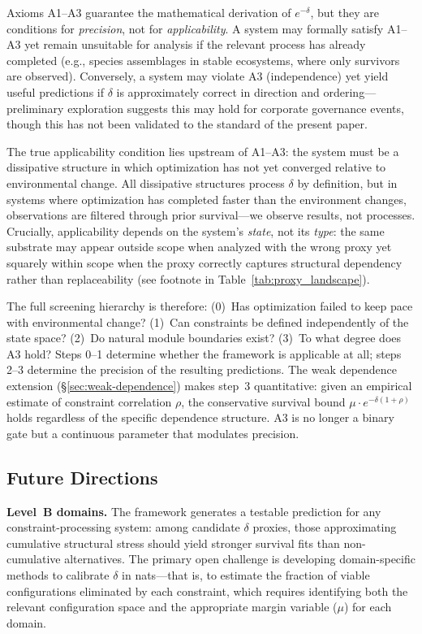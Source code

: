 \documentclass[11pt,a4paper]{article}
\begin{document}
Axioms A1--A3 guarantee the mathematical derivation of $e^{-\delta}$, but they are conditions for \emph{precision}, not for \emph{applicability}. A system may formally satisfy A1--A3 yet remain unsuitable for analysis if the relevant process has already completed (e.g., species assemblages in stable ecosystems, where only survivors are observed). Conversely, a system may violate A3 (independence) yet yield useful predictions if $\delta$ is approximately correct in direction and ordering---preliminary exploration suggests this may hold for corporate governance events, though this has not been validated to the standard of the present paper.

The true applicability condition lies upstream of A1--A3: the system must be a dissipative structure in which optimization has not yet converged relative to environmental change. All dissipative structures process $\delta$ by definition, but in systems where optimization has completed faster than the environment changes, observations are filtered through prior survival---we observe results, not processes. Crucially, applicability depends on the system's \emph{state}, not its \emph{type}: the same substrate may appear outside scope when analyzed with the wrong proxy yet squarely within scope when the proxy correctly captures structural dependency rather than replaceability (see footnote in Table~\ref{tab:proxy_landscape}).

The full screening hierarchy is therefore: (0)~Has optimization failed to keep pace with environmental change? (1)~Can constraints be defined independently of the state space? (2)~Do natural module boundaries exist? (3)~To what degree does A3 hold? Steps 0--1 determine whether the framework is applicable at all; steps 2--3 determine the precision of the resulting predictions. The weak dependence extension (\S\ref{sec:weak-dependence}) makes step~3 quantitative: given an empirical estimate of constraint correlation $\rho$, the conservative survival bound $\mu \cdot e^{-\delta(1+\rho)}$ holds regardless of the specific dependence structure. A3 is no longer a binary gate but a continuous parameter that modulates precision.

\subsection{Future Directions}

\textbf{Level~B domains.} The framework generates a testable prediction for any constraint-processing system: among candidate $\delta$ proxies, those approximating cumulative structural stress should yield stronger survival fits than non-cumulative alternatives. The primary open challenge is developing domain-specific methods to calibrate $\delta$ in nats---that is, to estimate the fraction of viable configurations eliminated by each constraint, which requires identifying both the relevant configuration space and the appropriate margin variable ($\mu$) for each domain.
\end{document}
